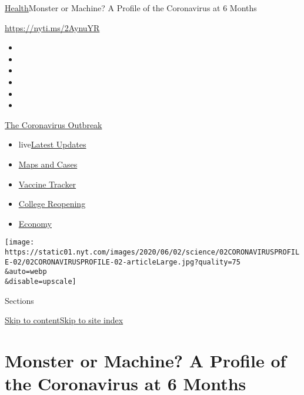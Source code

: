 \href{/section/health}{Health}\textbar{}Monster or Machine? A Profile of
the Coronavirus at 6 Months

\url{https://nyti.ms/2AynuYR}

\begin{itemize}
\item
\item
\item
\item
\item
\item
\end{itemize}

\href{https://www.nytimes.com/news-event/coronavirus?action=click\&pgtype=Article\&state=default\&region=TOP_BANNER\&context=storylines_menu}{The
Coronavirus Outbreak}

\begin{itemize}
\tightlist
\item
  live\href{https://www.nytimes.com/2020/08/04/world/coronavirus-cases.html?action=click\&pgtype=Article\&state=default\&region=TOP_BANNER\&context=storylines_menu}{Latest
  Updates}
\item
  \href{https://www.nytimes.com/interactive/2020/us/coronavirus-us-cases.html?action=click\&pgtype=Article\&state=default\&region=TOP_BANNER\&context=storylines_menu}{Maps
  and Cases}
\item
  \href{https://www.nytimes.com/interactive/2020/science/coronavirus-vaccine-tracker.html?action=click\&pgtype=Article\&state=default\&region=TOP_BANNER\&context=storylines_menu}{Vaccine
  Tracker}
\item
  \href{https://www.nytimes.com/2020/08/02/us/covid-college-reopening.html?action=click\&pgtype=Article\&state=default\&region=TOP_BANNER\&context=storylines_menu}{College
  Reopening}
\item
  \href{https://www.nytimes.com/live/2020/08/04/business/stock-market-today-coronavirus?action=click\&pgtype=Article\&state=default\&region=TOP_BANNER\&context=storylines_menu}{Economy}
\end{itemize}

\texttt{[image: https://static01.nyt.com/images/2020/06/02/science/02CORONAVIRUSPROFILE-02/02CORONAVIRUSPROFILE-02-articleLarge.jpg?quality=75\\\&auto=webp\\\&disable=upscale]}

Sections

\protect\hyperlink{site-content}{Skip to
content}\protect\hyperlink{site-index}{Skip to site index}

\hypertarget{monster-or-machine-a-profile-of-the-coronavirus-at-6-months}{%
\section{Monster or Machine? A Profile of the Coronavirus at 6
Months}\label{monster-or-machine-a-profile-of-the-coronavirus-at-6-months}}

